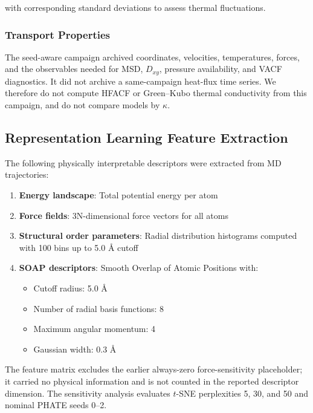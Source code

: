 \documentclass[pdflatex,sn-mathphys-num]{sn-jnl}%
\theoremstyle{thmstyleone}%
\theoremstyle{thmstyletwo}%
\theoremstyle{thmstylethree}%
\begin{document}
with corresponding standard deviations to assess thermal fluctuations.

\subsubsection{Transport Properties}

The seed-aware campaign archived coordinates, velocities, temperatures, forces, and the observables needed for MSD, $D_{xy}$, pressure availability, and VACF diagnostics. It did not archive a same-campaign heat-flux time series. We therefore do not compute HFACF or Green--Kubo thermal conductivity from this campaign, and do not compare models by $\kappa$.

\subsection{Representation Learning Feature Extraction}
The following physically interpretable descriptors were extracted from MD trajectories:
\begin{enumerate}
\item \textbf{Energy landscape}: Total potential energy per atom
\item \textbf{Force fields}: 3N-dimensional force vectors for all atoms
\item \textbf{Structural order parameters}: Radial distribution histograms computed with 100 bins up to 5.0 \AA{} cutoff
\item \textbf{SOAP descriptors}: Smooth Overlap of Atomic Positions with:
  \begin{itemize}
  \item Cutoff radius: 5.0 \AA
  \item Number of radial basis functions: 8
  \item Maximum angular momentum: 4
  \item Gaussian width: 0.3 \AA
  \end{itemize}
\end{enumerate}

The feature matrix excludes the earlier always-zero force-sensitivity placeholder; it carried no physical information and is not counted in the reported descriptor dimension. The sensitivity analysis evaluates $t$-SNE perplexities 5, 30, and 50 and nominal PHATE seeds 0--2.
\end{document}
